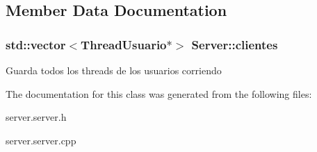 \subsection{Member Data Documentation}
\hypertarget{classServer_a295a2426aee46c5a82085fa5b70828c2}{
\subsubsection[{clientes}]{\setlength{\rightskip}{0pt plus 5cm}std\-::vector$<${\bf Thread\-Usuario}$\ast$$>$ Server\-::clientes\hspace{0.3cm}{\ttfamily [protected]}}}\label{classServer_a295a2426aee46c5a82085fa5b70828c2}
Guarda todos los threads de los usuarios corriendo 

The documentation for this class was generated from the following files\-:\begin{DoxyCompactItemize}
\item 
server.\-server.\-h\item 
server.\-server.\-cpp\end{DoxyCompactItemize}
